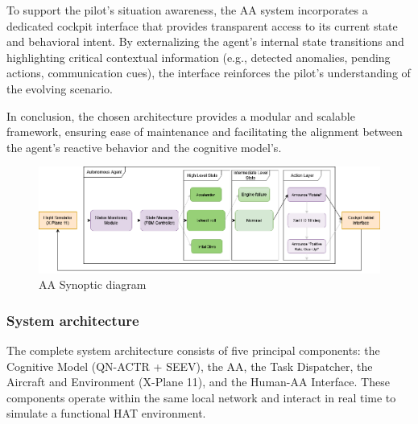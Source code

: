 \documentclass[12pt,a4paper]{article} %
\begin{document}
	To support the pilot's situation awareness, the AA system incorporates a dedicated cockpit interface that provides transparent access to its current state and behavioral intent. By externalizing the agent's internal state transitions and highlighting critical contextual information (e.g., detected anomalies, pending actions, communication cues), the interface reinforces the pilot's understanding of the evolving scenario. 

	In conclusion, the chosen architecture provides a modular and scalable framework, ensuring ease of maintenance and facilitating the alignment between the agent's reactive behavior and the cognitive model's.

	\begin{figure}[H]
		\centering
		\includegraphics[width=1.0\textwidth]{./images/AA_synoptic.png}
		\caption{AA Synoptic diagram}
		\label{fig:aa_synoptic}
	\end{figure}
	
	\subsubsection{System architecture}
	The complete system architecture consists of five principal components: the Cognitive Model (QN-ACTR + SEEV), the AA, the Task Dispatcher, the Aircraft and Environment (X-Plane 11), and the Human-AA Interface. These components operate within the same local network and interact in real time to simulate a functional HAT environment.
	
\end{document}
